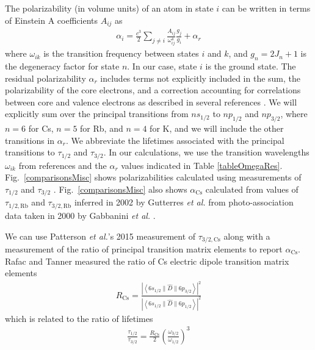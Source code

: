 \documentclass[twocolumn,pra,showpacs,superscriptaddress,longbibliography]{revtex4-1}   %
\newcommand{\brakett}[3]{\left.\left\langle#1\right.\right.\|#2\|\left.\left.#3\right\rangle\right.}
\newcommand{\figref}[1]{Fig.~\ref{#1}}
\newcommand{\acs}{\alpha_{\textrm{Cs}}}
\newcommand{\rcs}{R_{\mathrm{Cs}}}
\newcommand{\etal}{\textit{et al.}}
\newcommand{\etalspace}{\textit{et al. }}
\begin{document}
The polarizability (in volume units) of an atom in state $i$ can be written in terms of Einstein A coefficients $A_{ij}$ as
\begin{align}
	\alpha_i = \frac{c^3}{2} \sum_{j\neq i} 
	\frac{A_{ij}}{\omega_{ij}^4} \frac{g_j}{g_i}
	+ \alpha_r
	\label{polFromLifetimes}
\end{align}
where $\omega_{ik}$ is the transition frequency between states $i$ and $k$, and $g_n = 2J_n+1$ is the degeneracy factor for state $n$. In our case, state $i$ is the ground state. The residual polarizability $\alpha_r$ includes terms not explicitly included in the sum, the polarizability of the core electrons, and a correction accounting for correlations between core and valence electrons as described in several references 
\cite{Derevianko1998, Derevianko2001, Safronova2006}.  We will explicitly sum over the principal transitions from $ns_{1/2}$ to $np_{1/2}$ and $np_{3/2}$, where $n=6$ for Cs, $n=5$ for Rb, and $n=4$ for K, and we will include the other transitions in $\alpha_r$. We abbreviate the lifetimes associated with the principal transitions to $\tau_{1/2}$ and $\tau_{3/2}$. In our calculations, we use the transition wavelengths $\omega_{ik}$ from references
\cite{Gerginov2005, Gerginov2006, Falke2006, Johansson1961}
and the $\alpha_r$ values indicated in Table \ref{tableOmegaRes}.
\figref{comparisonsMisc} shows polarizabilities calculated using measurements of $\tau_{1/2}$ and $\tau_{3/2}$
\cite{Young1994,Rafac1999,Bouloufa2007,Falke2006a,Volz2006,Simsarian1998,Wang1997}.
\figref{comparisonsMisc} also shows $\acs$ calculated from
values of $\tau_{1/2,\mathrm{Rb}}$ and $\tau_{3/2,\mathrm{Rb}}$ inferred in 2002 by Gutterres \etalspace from photo-association data taken in 2000 by Gabbanini \etalspace \cite{Gabbanini2000,Gutterres2002}.

We can use Patterson \etal's 2015 measurement of $\tau_{3/2,\mathrm{Cs}}$ \cite{Patterson2015} along with a measurement of the ratio of principal transition matrix elements to report $\acs$.
Rafac and Tanner measured the ratio of Cs electric dipole transition matrix elements \cite{Rafac1998}
\begin{align}
	\rcs = \frac
	{\left|\brakett{6s_{1/2}}{\hat{D}}{6p_{3/2}}\right|^2}
	{\left|\brakett{6s_{1/2}}{\hat{D}}{6p_{1/2}}\right|^2}
	\label{polFromLifetimes}
\end{align}
which is related to the ratio of lifetimes
\begin{align}
	\frac{\tau_{1/2}}{\tau_{3/2}} = \frac{\rcs}{2} \left( \frac{\omega_{3/2}}{\omega_{1/2}} \right)^3
	\label{RafacRLifetimes}
\end{align}
\end{document}
